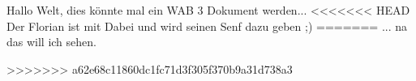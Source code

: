 \documentclass[a4paper,12pt]{scrreprt}
\begin{document}
Hallo Welt, dies könnte mal ein WAB 3 Dokument werden...
<<<<<<< HEAD
Der Florian ist mit Dabei und wird seinen Senf dazu geben ;)
=======
... na das will ich sehen.

>>>>>>> a62e68c11860dc1fc71d3f305f370b9a31d738a3
\end{document}

